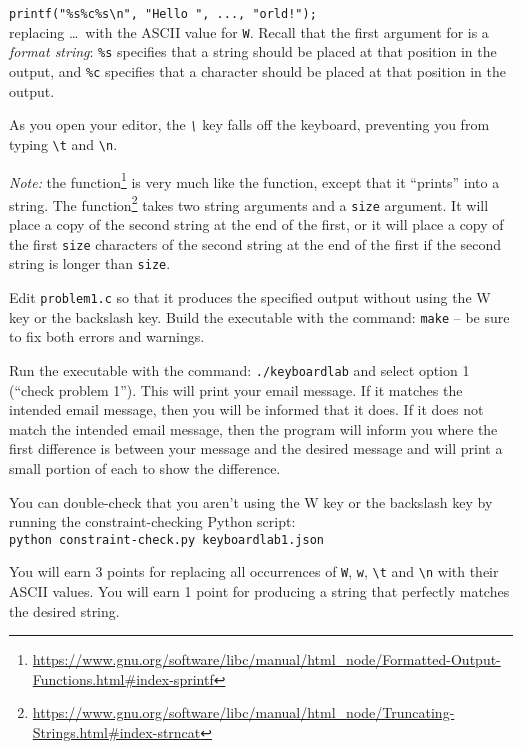\lstinline{printf("%s%c%s\n", "Hello ", ..., "orld!");} \\
replacing \dots\ with the ASCII value for \texttt{W}.
Recall that the first argument for  is a \textit{format string}: \texttt{\%s} specifies that a string should be placed at that position in the output, and \texttt{\%c} specifies that a character should be placed at that position in the output.

As you open your editor, the \textit{\texttt{\textbackslash}} key falls off the keyboard, preventing you from typing \texttt{\textbackslash t} and \texttt{\textbackslash n}.

\textit{Note: } the  function\footnote{\url{https://www.gnu.org/software/libc/manual/html_node/Formatted-Output-Functions.html\#index-sprintf}} is very much like the  function, except that it ``prints'' into a string.
The  function\footnote{\url{https://www.gnu.org/software/libc/manual/html_node/Truncating-Strings.html\#index-strncat}} takes two string arguments and a \lstinline{size} argument.
It will place a copy of the second string at the end of the first, or it will place a copy of the first \lstinline{size} characters of the second string at the end of the first if the second string is longer than \lstinline{size}.

Edit \texttt{problem1.c} so that it produces the specified output without using the W key or the backslash key.
Build the executable with the command: \texttt{make} -- be sure to fix both errors and warnings.

Run the executable with the command: \texttt{./keyboardlab} and select option 1 (``check problem 1'').
This will print your email message.
If it matches the intended email message, then you will be informed that it does.
If it does not match the intended email message, then the program will inform you where the first difference is between your message and the desired message and will print a small portion of each to show the difference.

You can double-check that you aren't using the W key or the backslash key by running the constraint-checking Python script: \\
\texttt{python constraint-check.py keyboardlab1.json}

You will earn 3 points for replacing all occurrences of \texttt{W}, \texttt{w}, \texttt{\textbackslash t} and \texttt{\textbackslash n} with their ASCII values.
You will earn 1 point for producing a string that perfectly matches the desired string.

